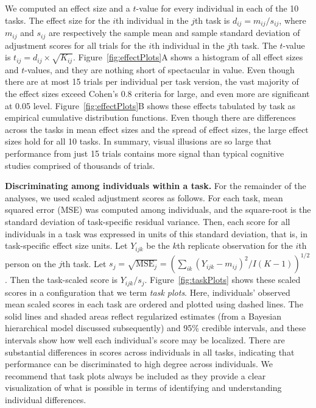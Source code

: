 We computed an effect size and a $t$-value for every individual in each of the 10 tasks.  The effect size for the $i$th individual in the $j$th task is $d_{ij}=m_{ij}/s_{ij}$, where $m_{ij}$ and $s_{ij}$ are respectively the sample mean and sample standard deviation of adjustment scores for all trials for the $i$th individual in the $j$th task.  The $t$-value is $t_{ij}=d_{ij}\times\sqrt{K_{ij}}$.  Figure~\ref{fig:effectPlots}A shows a histogram of all effect sizes and $t$-values, and they are nothing short of spectacular in value.  Even though there are at most 15 trials per individual per task version, the vast majority of the effect sizes exceed Cohen's 0.8 criteria for large, and even more are significant at 0.05 level.   Figure~\ref{fig:effectPlots}B shows these effects tabulated by task as empirical cumulative distribution functions.  Even though there are differences across the tasks in mean effect sizes and the spread of effect sizes, the large effect sizes hold for all 10 tasks.  In summary, visual illusions are so large that performance from just 15 trials contains more signal than typical cognitive studies comprised of thousands of trials.

{\bf Discriminating among individuals within a task.}  For the remainder of the analyses, we used scaled adjustment scores as follows.  For each task, mean squared error (MSE) was computed among individuals, and the square-root is the standard deviation of task-specific residual variance.  Then, each score for all individuals in a task was expressed in units of this standard deviation, that is, in task-specific effect size units.  Let $Y_{ijk}$ be the $k$th replicate observation for the $i$th person on the $j$th task.  Let $s_j=\sqrt{\mbox{MSE}_j}=\left(\sum_{ik}(Y_{ijk}-m_{ij})^2/I(K-1)\right)^{1/2}$. Then the task-scaled score is $Y_{ijk}/s_j$.  Figure~\ref{fig:taskPlots} shows these scaled scores in a configuration that we term {\em task plots}. Here, individuals' observed mean scaled scores in each task are ordered and plotted using dashed lines.  The solid lines and shaded areas reflect regularized estimates (from a Bayesian hierarchical model discussed subsequently) and 95\% credible intervals, and these intervals show how well each individual's score may be localized.  There are substantial differences in scores across individuals in all tasks, indicating that performance can be discriminated to high degree across individuals. We recommend that task plots always be included as they provide a clear visualization of what is possible in terms of identifying and understanding individual differences.


